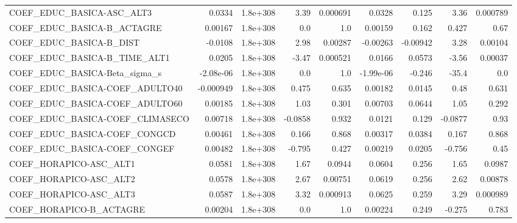 \begin{tabular}{lrrrrrrrr}
COEF\_EDUC\_BASICA-ASC\_ALT3         &      0.0334 &     1.8e+308 &    3.39 & 0.000691 &     0.0328 &       0.125 &         3.36 &      0.000789 \\
COEF\_EDUC\_BASICA-B\_ACTAGRE        &     0.00167 &     1.8e+308 &     0.0 &      1.0 &    0.00159 &       0.162 &        0.427 &          0.67 \\
COEF\_EDUC\_BASICA-B\_DIST           &     -0.0108 &     1.8e+308 &    2.98 &  0.00287 &   -0.00263 &    -0.00942 &         3.28 &       0.00104 \\
COEF\_EDUC\_BASICA-B\_TIME\_ALT1      &      0.0205 &     1.8e+308 &   -3.47 & 0.000521 &     0.0166 &      0.0573 &        -3.56 &       0.00037 \\
COEF\_EDUC\_BASICA-Beta\_sigma\_s     &   -2.08e-06 &     1.8e+308 &     0.0 &      1.0 &  -1.99e-06 &      -0.246 &        -35.4 &           0.0 \\
COEF\_EDUC\_BASICA-COEF\_ADULTO40    &   -0.000949 &     1.8e+308 &   0.475 &    0.635 &    0.00182 &      0.0145 &         0.48 &         0.631 \\
COEF\_EDUC\_BASICA-COEF\_ADULTO60    &     0.00185 &     1.8e+308 &    1.03 &    0.301 &    0.00703 &      0.0644 &         1.05 &         0.292 \\
COEF\_EDUC\_BASICA-COEF\_CLIMASECO   &     0.00718 &     1.8e+308 & -0.0858 &    0.932 &     0.0121 &       0.129 &      -0.0877 &          0.93 \\
COEF\_EDUC\_BASICA-COEF\_CONGCD      &     0.00461 &     1.8e+308 &   0.166 &    0.868 &    0.00317 &      0.0384 &        0.167 &         0.868 \\
COEF\_EDUC\_BASICA-COEF\_CONGEF      &     0.00482 &     1.8e+308 &  -0.795 &    0.427 &    0.00219 &      0.0205 &       -0.756 &          0.45 \\
COEF\_HORAPICO-ASC\_ALT1            &      0.0581 &     1.8e+308 &    1.67 &   0.0944 &     0.0604 &       0.256 &         1.65 &        0.0987 \\
COEF\_HORAPICO-ASC\_ALT2            &      0.0578 &     1.8e+308 &    2.67 &  0.00751 &     0.0619 &       0.256 &         2.62 &       0.00878 \\
COEF\_HORAPICO-ASC\_ALT3            &      0.0587 &     1.8e+308 &    3.32 & 0.000913 &     0.0625 &       0.259 &         3.29 &      0.000989 \\
COEF\_HORAPICO-B\_ACTAGRE           &     0.00204 &     1.8e+308 &     0.0 &      1.0 &    0.00224 &       0.249 &       -0.275 &         0.783 \\

\end{tabular}
